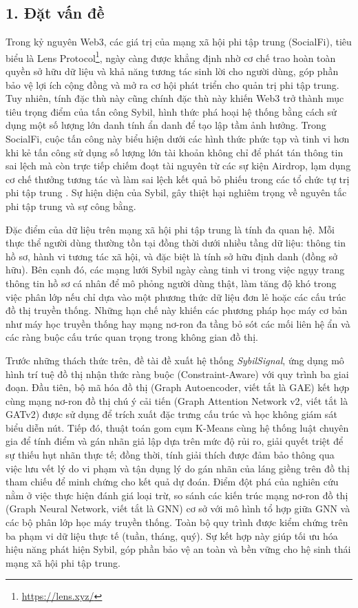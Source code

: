\subsection{1. Đặt vấn đề}

\indent\indent Trong kỷ nguyên Web3, các giá trị của mạng xã hội phi tập trung (SocialFi), tiêu biểu là Lens Protocol\footnote{\url{https://lens.xyz/}}, ngày càng được khẳng định nhờ cơ chế trao hoàn toàn quyền sở hữu dữ liệu và khả năng tương tác sinh lời cho người dùng, góp phần bảo vệ lợi ích cộng đồng và mở ra cơ hội phát triển cho quản trị phi tập trung. Tuy nhiên, tính đặc thù này cũng chính đặc thù này khiến Web3 trở thành mục tiêu trọng điểm của tấn công Sybil, hình thức phá hoại hệ thống bằng cách sử dụng một số lượng lớn danh tính ẩn danh để tạo lập tầm ảnh hưởng. Trong SocialFi, cuộc tấn công này biểu hiện dưới các hình thức phức tạp và tinh vi hơn khi kẻ tấn công sử dụng số lượng lớn tài khoản không chỉ để phát tán thông tin sai lệch mà còn trực tiếp chiếm đoạt tài nguyên từ các sự kiện Airdrop, lạm dụng cơ chế thưởng tương tác và làm sai lệch kết quả bỏ phiếu trong các tổ chức tự trị phi tập trung \cite{liu2025detecting}. Sự hiện diện của Sybil, gây thiệt hại nghiêm trọng về nguyên tắc phi tập trung và sự công bằng.\vspace{0.3cm}

Đặc điểm của dữ liệu trên mạng xã hội phi tập trung là tính đa quan hệ. Mỗi thực thể người dùng thường tồn tại đồng thời dưới nhiều tầng dữ liệu: thông tin hồ sơ, hành vi tương tác xã hội, và đặc biệt là tính sở hữu định danh (đồng sở hữu). Bên cạnh đó, các mạng lưới Sybil ngày càng tinh vi trong việc ngụy trang thông tin hồ sơ cá nhân để mô phỏng người dùng thật, làm tăng độ khó trong việc phân lớp nếu chỉ dựa vào một phương thức dữ liệu đơn lẻ hoặc các cấu trúc đồ thị truyền thống. Những hạn chế này khiến các phương pháp học máy cơ bản như máy học truyền thống hay mạng nơ-ron đa tầng bỏ sót các mối liên hệ ẩn và các ràng buộc cấu trúc quan trọng trong không gian đồ thị.\vspace{0.3cm}

Trước những thách thức trên, đề tài đề xuất hệ thống \textit{SybilSignal}, ứng dụng mô hình trí tuệ đồ thị nhận thức ràng buộc (Constraint-Aware) với quy trình ba giai đoạn. Đầu tiên, bộ mã hóa đồ thị (Graph Autoencoder, viết tắt là GAE) kết hợp cùng mạng nơ-ron đồ thị chú ý cải tiến (Graph Attention Network v2, viết tắt là GATv2) được sử dụng để trích xuất đặc trưng cấu trúc và học không giám sát biểu diễn nút. Tiếp đó, thuật toán gom cụm K-Means cùng hệ thống luật chuyên gia để tính điểm và gán nhãn giả lập dựa trên mức độ rủi ro, giải quyết triệt để sự thiếu hụt nhãn thực tế; đồng thời, tính giải thích được đảm bảo thông qua việc lưu vết lý do vi phạm và tận dụng lý do gán nhãn của láng giềng trên đồ thị tham chiếu để minh chứng cho kết quả dự đoán. Điểm đột phá của nghiên cứu nằm ở việc thực hiện đánh giá loại trừ, so sánh các kiến trúc mạng nơ-ron đồ thị (Graph Neural Network, viết tắt là GNN) cơ sở với mô hình tổ hợp giữa GNN và các bộ phân lớp học máy truyền thống. Toàn bộ quy trình được kiểm chứng trên ba phạm vi dữ liệu thực tế (tuần, tháng, quý). Sự kết hợp này giúp tối ưu hóa hiệu năng phát hiện Sybil, góp phần bảo vệ an toàn và bền vững cho hệ sinh thái mạng xã hội phi tập trung.